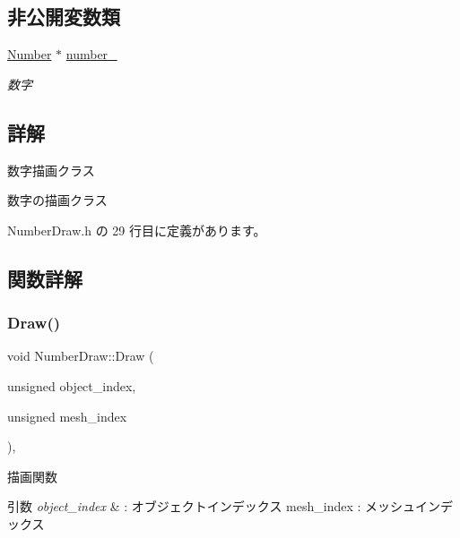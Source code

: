 \subsection*{非公開変数類}
\begin{DoxyCompactItemize}
\item 
\mbox{\hyperlink{class_number}{Number}} $\ast$ \mbox{\hyperlink{class_number_draw_a8063f58804542a7f86b341eec4cc1e60}{number\+\_\+}}
\begin{DoxyCompactList}\small\item\em 数字 \end{DoxyCompactList}\end{DoxyCompactItemize}


\subsection{詳解}
数字描画クラス 

数字の描画クラス 

 Number\+Draw.\+h の 29 行目に定義があります。



\subsection{関数詳解}
\mbox{\label{class_number_draw_a15e4e602b3f9372349d0b6ff9e4fc423}} 
\subsubsection{\texorpdfstring{Draw()}{Draw()}}
{\footnotesize\ttfamily void Number\+Draw\+::\+Draw (\begin{DoxyParamCaption}\item[{unsigned}]{object\+\_\+index,  }\item[{unsigned}]{mesh\+\_\+index }\end{DoxyParamCaption})\hspace{0.3cm}{\ttfamily [override]}, {\ttfamily [virtual]}}



描画関数 


\begin{DoxyParams}{引数}
{\em object\+\_\+index} & \+: オブジェクトインデックス mesh\+\_\+index \+: メッシュインデックス \\
\hline
\end{DoxyParams}


